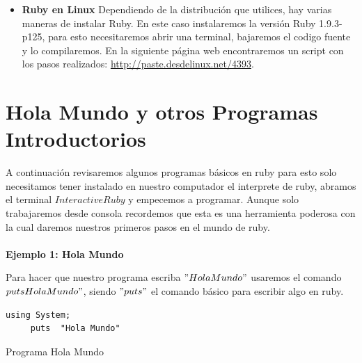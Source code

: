 \documentclass[11pt]{article} %
\begin{document}
\begin{itemize}
\item{\bf Ruby en Linux}
Dependiendo de la distribución que utilices, hay varias maneras de instalar Ruby. En este caso instalaremos la versión Ruby 1.9.3-p125, para esto necesitaremos abrir una terminal, bajaremos el codigo fuente y lo compilaremos.
En la siguiente página web encontraremos un script con los pasos realizados: \url {http://paste.desdelinux.net/4393}.

\end{itemize}


\section{\fontsize{14}{0} \bf Hola Mundo y otros Programas Introductorios}

A continuación revisaremos algunos programas básicos en ruby para esto solo necesitamos tener instalado en nuestro computador el interprete de ruby, abramos el terminal $ Interactive Ruby$  y empecemos a  programar. Aunque  solo trabajaremos desde consola  recordemos que esta es una herramienta poderosa con la cual daremos nuestros primeros pasos en el mundo de ruby.\\ \\


 {\fontsize{14}{0} \bf Ejemplo 1: Hola Mundo\\}

Para hacer que nuestro programa escriba $"Hola Mundo"$ usaremos el comando $puts Hola Mundo"$,
 siendo  $"puts"$ el comando básico para escribir algo en ruby. \\


\begin{lstlisting}[frame=single]  % Start your code-block
using System;
     puts  "Hola Mundo"
\end{lstlisting}
\begin{center}
Programa Hola Mundo
\end{center}
\end{document}

